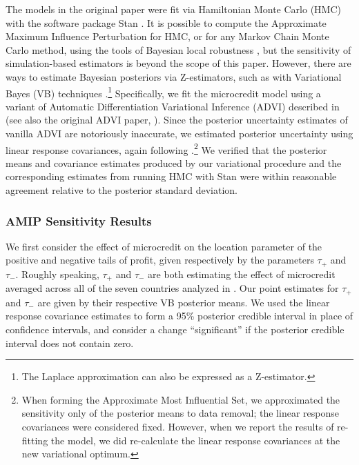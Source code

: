 The models in the original paper were fit via Hamiltonian Monte Carlo (HMC) with
the software package Stan \citep{carpenter2017stan}. It is possible to compute
the Approximate Maximum Influence Perturbation for HMC, or for any Markov Chain
Monte Carlo method, using the tools of Bayesian local robustness
\citep{gustafson2000local, giordano2018covariances}, but the sensitivity of
simulation-based estimators is beyond the scope of this paper. However, there
are ways to estimate Bayesian posteriors via Z-estimators, such as with
Variational Bayes (VB) techniques \citep{blei2016variational}.\footnote{The
Laplace approximation can also be expressed as a Z-estimator.} Specifically, we
fit the microcredit model using a variant of Automatic Differentiation
Variational Inference (ADVI) described in \citet[Section
5.2]{giordano2018covariances} (see also the original ADVI paper,
\citet{kucukelbir2017advi}).  Since the posterior uncertainty estimates of
vanilla ADVI are notoriously inaccurate, we estimated posterior uncertainty
using linear response covariances, again following \citet[Section
5.2]{giordano2018covariances}.\footnote{When forming the Approximate Most
Influential Set, we approximated the sensitivity only of the posterior means to
data removal; the linear response covariances were considered fixed.  However,
when we report the results of re-fitting the model, we did re-calculate the
linear response covariances at the new variational optimum.}  We verified that
the posterior means and covariance estimates produced by our variational
procedure and the corresponding estimates from running HMC with Stan were within
reasonable agreement relative to the posterior standard deviation.

\subsubsection{AMIP Sensitivity Results}
%
We first consider the effect of microcredit on the location parameter of the
positive and negative tails of profit, given respectively by the parameters
$\tau_{+}$ and $\tau_{-}$.  Roughly speaking, $\tau_{+}$ and $\tau_{-}$ are both
estimating the effect of microcredit averaged across all of the seven countries
analyzed in .  Our point estimates for
$\tau_{+}$ and $\tau_{-}$ are given by their respective VB posterior means.  We
used the linear response covariance estimates to form a 95\% posterior credible
interval in place of confidence intervals, and consider a change ``significant''
if the posterior credible interval does not contain zero.

